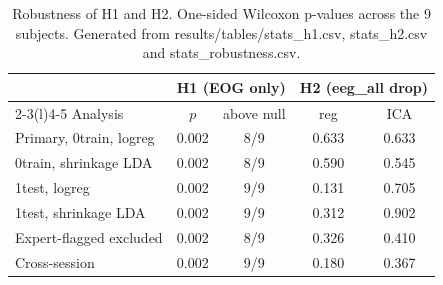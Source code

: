 \begin{table}[t]
\caption{Robustness of H1 and H2. One-sided Wilcoxon p-values across the 9 subjects. Generated from results/tables/stats\_h1.csv, stats\_h2.csv and stats\_robustness.csv.}
\label{tab:robust}
\centering
\footnotesize
\setlength{\tabcolsep}{3pt}
\begin{tabular}{@{}lcccc@{}}
\toprule
 & \multicolumn{2}{c}{H1 (EOG only)} & \multicolumn{2}{c}{H2 (eeg\_all drop)}\\
\cmidrule(lr){2-3}\cmidrule(l){4-5}
Analysis & $p$ & above null & reg & ICA\\
\midrule
Primary, 0train, logreg & 0.002 & 8/9 & 0.633 & 0.633 \\
0train, shrinkage LDA & 0.002 & 8/9 & 0.590 & 0.545 \\
1test, logreg & 0.002 & 9/9 & 0.131 & 0.705 \\
1test, shrinkage LDA & 0.002 & 9/9 & 0.312 & 0.902 \\
Expert-flagged excluded & 0.002 & 8/9 & 0.326 & 0.410 \\
Cross-session & 0.002 & 9/9 & 0.180 & 0.367 \\
\bottomrule
\end{tabular}
\end{table}
